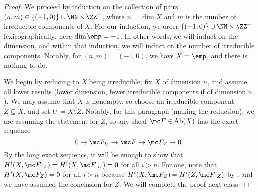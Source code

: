 \documentclass[../notes.tex]{subfiles}
\begin{document}
\begin{proof}
	We proceed by induction on the collection of pairs $(n,m)\in\{(-1,0)\}\cup\NN\times\ZZ^+$, where $n=\dim X$ and $m$ is the number of irreducible components of $X$. For our induction, we order $\{(-1,0)\}\cup\NN\times\ZZ^+$ lexicographically; here $\dim\emp=-1$. In other words, we will induct on the dimension, and within that induction, we will induct on the number of irreducible components. Notably, for $(n,m)=(-1,0)$, we have $X=\emp$, and there is nothing to do.

	We begin by reducing to $X$ being irreducible; fix $X$ of dimension $n$, and assume all lower results (lower dimension, fewer irreducible components if of dimension $n$). We may assume that $X$ is nonempty, so choose an irreducible component $Z\subseteq X$, and set $U\coloneqq X\setminus Z$. Notably, for this paragraph (making the reduction), we are assuming the statement for $Z$, so any sheaf $\mc F\in\mathrm{Ab}(X)$ has the exact sequence
	\[0\to\mc F_U\to\mc F\to\mc F_Z\to0.\]
	By the long exact sequence, it will be enough to show that $H^i(X,\mc F|_Z)=H^i(X,\mc F|_U)=0$ for all $i>n$. For one, note that $H^i(X,\mc F_Z)=0$ for all $i>n$ because $H^i(X,\mc F_Z)=H^i(Z,\mc F|_Z)$ by , and we have assumed the conclusion for $Z$. We will complete the proof next class.
\end{proof}
\end{document}
